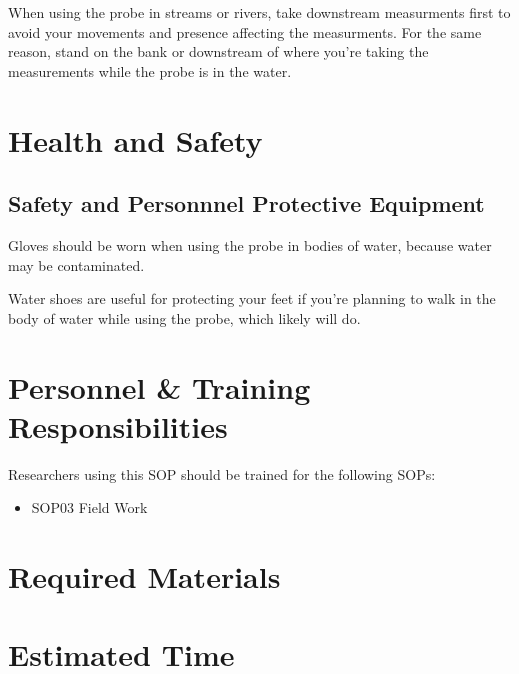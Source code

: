 \documentclass[12pt]{../SOP3_beta}\usepackage[]{graphicx}\usepackage[]{color}
\begin{document}
\NP When using the probe in streams or rivers, take downstream measurments first to avoid your movements and presence affecting the measurments. For the same reason, stand on the bank or downstream of where you're taking the measurements while the probe is in the water.  

\section{Health and Safety}

\subsection{Safety and Personnnel Protective Equipment}

\NP Gloves should be worn when using the probe in bodies of water, because water may be contaminated. 

\NP Water shoes are useful for protecting your feet if you're planning to walk in the body of water while using the probe, which likely will do. 

\section{Personnel \& Training Responsibilities}

Researchers using this SOP should be trained for the following SOPs:

\begin{itemize}
  \item SOP03 Field Work
\end{itemize}

\section{Required Materials}






\section{Estimated Time}
\end{document}
